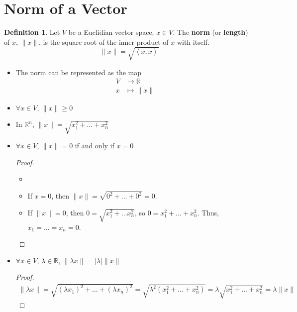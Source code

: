 \documentclass[letterpaper,12pt]{article}
\theoremstyle{definition}
\newtheorem*{definition}{Definition}
\newcommand{\abs}[1]{\left\lvert #1 \right\rvert} %
\newcommand{\inp}[2]{\left< #1, #2 \right>}
\newcommand{\norm}[1]{\| #1 \|}
\begin{document}
\section*{Norm of a Vector}
\begin{definition}
Let $V$ be a Euclidian vector space, $x \in V$. The \textbf{norm} (or \textbf{length}) of $x$, $\norm{x}$, is the square root of the inner product of $x$ with itself.
\begin{equation*}
    \norm{x} = \sqrt{\inp{x}{x}}
\end{equation*}
\begin{itemize}
    \item The norm can be represented as the map
    \begin{align*}
        V & \longrightarrow \mathbb{R} \\
        x & \longmapsto \norm{x}
    \end{align*}
    \item $\forall x \in V$, $\norm{x} \geq 0$
    \item In $\mathbb{R}^n$, $\norm{x} = \sqrt{x_1^2 + \dots + x_n^2}$
    
    \item $\forall x \in V$, $\norm{x} = 0$ if and only if $x = 0$
    \begin{proof}
    \begin{itemize}
        \item[]
        \item If $x = 0$, then $\norm{x} = \sqrt{0^2 + \dots + 0^2} = 0$.
        \item If $\norm{x} = 0$, then $0 = \sqrt{x_1^2 + \dots x_n^2}$, so $0 = x_1^2 + \dots + x_n^2$. Thus, $x_1 = \dots = x_n = 0$.
    \end{itemize}
    \end{proof}
    \item $\forall x \in V$, $\lambda \in \mathbb{R}$, $\norm{\lambda x} = \abs{\lambda} \norm{x}$
    \begin{proof}
    \begin{align*}
        \norm{\lambda x} = \sqrt{(\lambda x_1)^2 + \dots + (\lambda x_n)^2} = \sqrt{\lambda^2(x_1^2 + \dots + x_n^2)} = \lambda \sqrt{x_1^2 + \dots + x_n^2} = \lambda \norm{x}
    \end{align*}
    \end{proof}
\end{itemize}
\end{definition}
\end{document}

